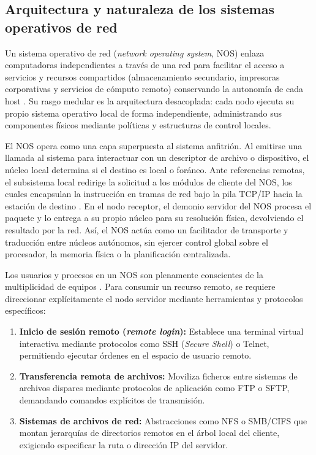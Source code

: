 \documentclass[12pt]{article}
\begin{document}
\subsection{Arquitectura y naturaleza de los sistemas operativos de red}
\label{sec:arquitecturaNos}

Un sistema operativo de red (\textit{network operating system}, NOS) enlaza computadoras independientes a través de una red para facilitar el acceso a servicios y recursos compartidos (almacenamiento secundario, impresoras corporativas y servicios de cómputo remoto) conservando la autonomía de cada host \parencite[\S 10, p.\ 318]{mchoes2011sistemas}. Su rasgo medular es la arquitectura desacoplada: cada nodo ejecuta su propio sistema operativo local de forma independiente, administrando sus componentes físicos mediante políticas y estructuras de control locales.

El NOS opera como una capa superpuesta al sistema anfitrión. Al emitirse una llamada al sistema para interactuar con un descriptor de archivo o dispositivo, el núcleo local determina si el destino es local o foráneo. Ante referencias remotas, el subsistema local redirige la solicitud a los módulos de cliente del NOS, los cuales encapsulan la instrucción en tramas de red bajo la pila TCP/IP hacia la estación de destino \parencite[\S 10, pp.\ 318--319]{mchoes2011sistemas}. En el nodo receptor, el demonio servidor del NOS procesa el paquete y lo entrega a su propio núcleo para su resolución física, devolviendo el resultado por la red. Así, el NOS actúa como un facilitador de transporte y traducción entre núcleos autónomos, sin ejercer control global sobre el procesador, la memoria física o la planificación centralizada.

Los usuarios y procesos en un NOS son plenamente conscientes de la multiplicidad de equipos \parencite[\S 16.2, pp.\ 559--561]{silberschatz2006fundamentos}. Para consumir un recurso remoto, se requiere direccionar explícitamente el nodo servidor mediante herramientas y protocolos específicos:
\begin{enumerate}[noitemsep, topsep=2pt, parsep=0pt]
    \item \textbf{Inicio de sesión remoto (\textit{remote login}):} Establece una terminal virtual interactiva mediante protocolos como SSH (\textit{Secure Shell}) o Telnet, permitiendo ejecutar órdenes en el espacio de usuario remoto.
    \item \textbf{Transferencia remota de archivos:} Moviliza ficheros entre sistemas de archivos dispares mediante protocolos de aplicación como FTP o SFTP, demandando comandos explícitos de transmisión.
    \item \textbf{Sistemas de archivos de red:} Abstracciones como NFS o SMB/CIFS que montan jerarquías de directorios remotos en el árbol local del cliente, exigiendo especificar la ruta o dirección IP del servidor.
\end{enumerate}
\end{document}
